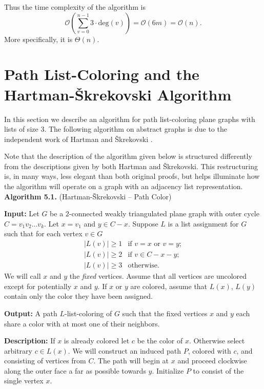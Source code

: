 \documentclass[letterpaper, 12pt]{article}
\theoremstyle{thm}
\begin{document}
Thus the time complexity of the algorithm is
\[
    \mathcal{O}\left(\sum_{v=0}^{n-1}3\cdot\text{deg}(v)\right)
    =\mathcal{O}(6m)=\mathcal{O}(n).
\]
More specifically, it is $\Theta(n)$.



\section{Path List-Coloring and the Hartman-\v{S}krekovski Algorithm}

In this section we describe an algorithm for path
list-coloring plane graphs with lists of size $3$. The following algorithm on
abstract graphs is due to the independent work of Hartman \cite{hartman} and
\v{S}krekovski \cite{skrekovski}.

Note that the description of the algorithm given below is structured differently
from the descriptions given by both Hartman and \v{S}krekovski. This restructuring is, in
many ways, less elegant than both original proofs, but helps illuminate how the
algorithm will operate on a graph with an adjacency list representation.\\

\noindent\textbf{Algorithm 5.1.} (Hartman-\v{S}krekovski -- Path Color)

\noindent\textbf{Input:} Let $G$ be a $2$-connected weakly triangulated plane
graph with outer cycle $C=v_1v_2\ldots v_k$. Let $x=v_1$ and $y\in C-x$.
Suppose $L$ is a list assignment for $G$ such that
for each vertex $v\in G$
\[
    \begin{array}{ll}
	    \big|L(v)\big|\ge 1 & \text{if } v=x \text{ or } v=y;\\
	    \big|L(v)\big|\ge 2 & \text{if } v\in C-x-y;\\
	    \big|L(v)\big|\ge 3 & \text{otherwise.}
    \end{array}
\]
We will call $x$ and $y$ the \textit{fixed} vertices. Assume that all vertices are
uncolored except for potentially $x$ and $y$. If $x$ or $y$ are colored, assume that
$L(x)$, $L(y)$ contain only the color they have been assigned. 

\noindent\textbf{Output:} A path $L$-list-coloring of $G$ such that the fixed
vertices $x$ and $y$ each share a color with at most one of their neighbors.

\noindent\textbf{Description:} If $x$ is already colored
let $c$ be the color of $x$. Otherwise select arbitrary $c\in L(x)$. We will 
construct an induced path $P$, colored with $c$, and consisting of vertices from
$C$. The path will begin at $x$ and proceed clockwise along the outer face a
far as possible towards $y$. Initialize $P$ to consist of the single vertex
$x$.
\end{document}
